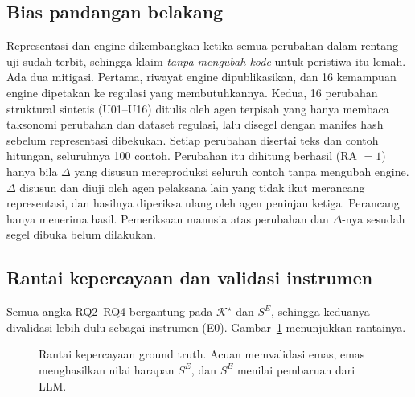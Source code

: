 \documentclass[journal,a4paper]{IEEEtran}
\makeatletter
\DeclareRobustCommand{\en}[1]{{\usefont{\f@encoding}{\f@family}{\f@series}{it}#1\/}}
\newcommand{\K}{\mathcal{K}}
\newcommand{\emas}{\star}
\newcommand{\SG}{S^{G}}
\newcommand{\SE}{S^{E}}
\makeatother
\begin{document}
\subsection{Bias pandangan belakang}
\label{subsec:hindsight}
Representasi dan \en{engine} dikembangkan ketika semua perubahan dalam rentang uji sudah terbit, sehingga klaim \emph{tanpa mengubah kode} untuk peristiwa itu lemah. Ada dua mitigasi. Pertama, riwayat \en{engine} dipublikasikan, dan 16 kemampuan \en{engine} dipetakan ke regulasi yang membutuhkannya. Kedua, 16 perubahan struktural sintetis (U01--U16) ditulis oleh agen terpisah yang hanya membaca taksonomi perubahan dan dataset regulasi, lalu disegel dengan manifes \en{hash} sebelum representasi dibekukan. Setiap perubahan disertai teks dan contoh hitungan, seluruhnya 100 contoh. Perubahan itu dihitung berhasil (RA $=1$) hanya bila $\Delta$ yang disusun mereproduksi seluruh contoh tanpa mengubah \en{engine}. $\Delta$ disusun dan diuji oleh agen pelaksana lain yang tidak ikut merancang representasi, dan hasilnya diperiksa ulang oleh agen peninjau ketiga. Perancang hanya menerima hasil. Pemeriksaan manusia atas perubahan dan $\Delta$-nya sesudah segel dibuka belum dilakukan.

\subsection{Rantai kepercayaan dan validasi instrumen}
\label{subsec:instrumen}
Semua angka RQ2--RQ4 bergantung pada $\K^{\emas}$ dan $\SE$, sehingga keduanya divalidasi lebih dulu sebagai instrumen (E0). Gambar~\ref{fig:rantai} menunjukkan rantainya.

\begin{figure}[t]
\centering
{}
\caption{Rantai kepercayaan \en{ground truth}. Acuan memvalidasi emas, emas menghasilkan nilai harapan $\SE$, dan $\SE$ menilai pembaruan dari LLM.}
\label{fig:rantai}
\end{figure}
\end{document}
